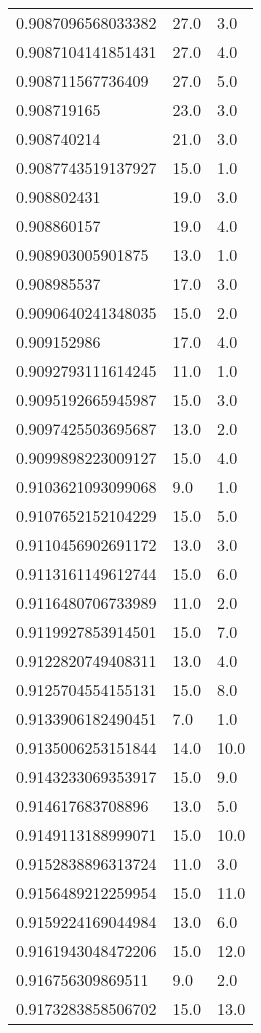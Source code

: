 \begin{center}
\begin{supertabular}[H]{p{0.30\textwidth}p{0.05\textwidth}p{0.05\textwidth}}
0.9087096568033382 & 27.0 & 3.0 \\ 
0.9087104141851431 & 27.0 & 4.0 \\ 
0.908711567736409 & 27.0 & 5.0 \\ 
0.908719165 & 23.0 & 3.0 \\ 
0.908740214 & 21.0 & 3.0 \\ 
0.9087743519137927 & 15.0 & 1.0 \\ 
0.908802431 & 19.0 & 3.0 \\ 
0.908860157 & 19.0 & 4.0 \\ 
0.908903005901875 & 13.0 & 1.0 \\ 
0.908985537 & 17.0 & 3.0 \\ 
0.9090640241348035 & 15.0 & 2.0 \\ 
0.909152986 & 17.0 & 4.0 \\ 
0.9092793111614245 & 11.0 & 1.0 \\ 
0.9095192665945987 & 15.0 & 3.0 \\ 
0.9097425503695687 & 13.0 & 2.0 \\ 
0.9099898223009127 & 15.0 & 4.0 \\ 
0.9103621093099068 & 9.0 & 1.0 \\ 
0.9107652152104229 & 15.0 & 5.0 \\ 
0.9110456902691172 & 13.0 & 3.0 \\ 
0.9113161149612744 & 15.0 & 6.0 \\ 
0.9116480706733989 & 11.0 & 2.0 \\ 
0.9119927853914501 & 15.0 & 7.0 \\ 
0.9122820749408311 & 13.0 & 4.0 \\ 
0.9125704554155131 & 15.0 & 8.0 \\ 
0.9133906182490451 & 7.0 & 1.0 \\ 
0.9135006253151844 & 14.0 & 10.0 \\ 
0.9143233069353917 & 15.0 & 9.0 \\ 
0.914617683708896 & 13.0 & 5.0 \\ 
0.9149113188999071 & 15.0 & 10.0 \\ 
0.9152838896313724 & 11.0 & 3.0 \\ 
0.9156489212259954 & 15.0 & 11.0 \\ 
0.9159224169044984 & 13.0 & 6.0 \\ 
0.9161943048472206 & 15.0 & 12.0 \\ 
0.916756309869511 & 9.0 & 2.0 \\ 
0.9173283858506702 & 15.0 & 13.0 \\ 

\end{supertabular}
\end{center}
